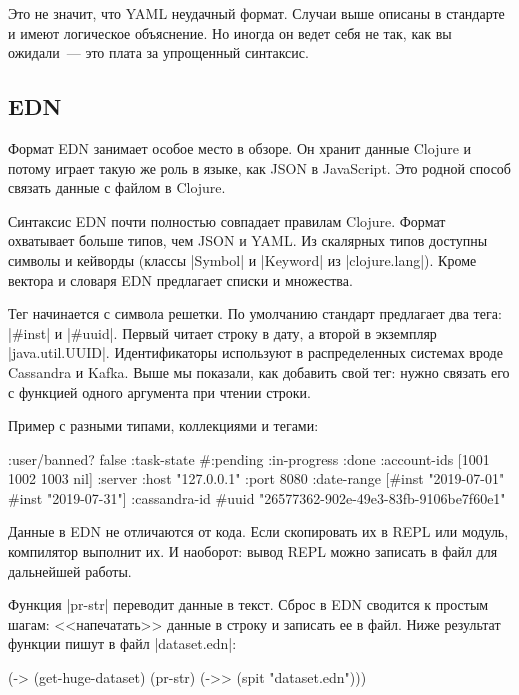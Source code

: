 Это не значит, что YAML неудачный формат. Случаи выше описаны в стандарте и
имеют логическое объяснение. Но иногда он ведет себя не так, как вы ожидали~---
это плата за упрощенный синтаксис.

\subsection{EDN}

Формат EDN занимает особое место в обзоре. Он хранит данные Clojure и потому
играет такую же роль в языке, как JSON в JavaScript. Это родной способ связать
данные с файлом в Clojure.

Синтаксис EDN почти полностью совпадает правилам Clojure. Формат охватывает
больше типов, чем JSON и YAML. Из скалярных типов доступны символы и
кейворды (классы \spverb|Symbol| и \spverb|Keyword| из
\spverb|clojure.lang|). Кроме вектора и словаря EDN предлагает списки и
множества.

Тег начинается с символа решетки. По умолчанию стандарт предлагает два тега:
\spverb|#inst| и \spverb|#uuid|. Первый читает строку в дату, а второй в
экземпляр \spverb|java.util.UUID|. Идентификаторы используют в распределенных
системах вроде Cassandra и Kafka. Выше мы показали, как добавить свой тег: нужно
связать его с функцией одного аргумента при чтении строки.

Пример с разными типами, коллекциями и тегами:

\begin{english}
  \begin{clojure}
{:user/banned? false
 :task-state #{:pending :in-progress :done}
 :account-ids [1001 1002 1003 nil]
 :server {:host "127.0.0.1" :port 8080}
 :date-range [#inst "2019-07-01" #inst "2019-07-31"]
 :cassandra-id #uuid "26577362-902e-49e3-83fb-9106be7f60e1"}
  \end{clojure}
\end{english}

Данные в EDN не отличаются от кода. Если скопировать их в REPL или модуль,
компилятор выполнит их. И наоборот: вывод REPL можно записать в файл для
дальнейшей работы.

Функция \spverb|pr-str| переводит данные в текст. Сброс в EDN сводится к простым
шагам: <<напечатать>> данные в строку и записать ее в файл. Ниже результат
функции пишут в файл \spverb|dataset.edn|:

\begin{english}
  \begin{clojure}
(-> (get-huge-dataset)
    (pr-str)
    (->> (spit "dataset.edn")))
  \end{clojure}
\end{english}

